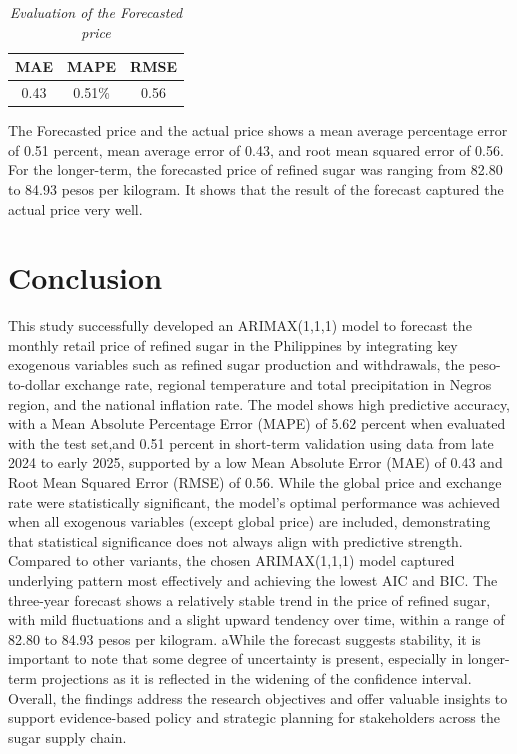 \documentclass[11pt]{article}
\begin{document}
\begin{table}[H]
    \caption{\textit{Evaluation of the Forecasted price}}
    \label{eval}
    \centering
    \begin{tabular}{ccc}
        \toprule
         MAE & MAPE & RMSE \\
        \midrule
        0.43 & 0.51\% & 0.56 \\
        \bottomrule
    \end{tabular}
\end{table}
The Forecasted price and the actual price shows a mean average percentage error of 0.51 percent, mean average error of 0.43, and root mean squared error of 0.56. For the longer-term, the forecasted price of refined sugar was ranging from 82.80 to 84.93 pesos per kilogram. It shows that the result of the forecast captured the actual price very well.

\section{Conclusion}

This study successfully developed an ARIMAX(1,1,1) model to forecast the monthly retail price of refined sugar in the Philippines by integrating key exogenous variables such as refined sugar production and withdrawals, the peso-to-dollar exchange rate, regional temperature and total precipitation in Negros region, and the national inflation rate. The model shows high predictive accuracy, with a Mean Absolute Percentage Error (MAPE) of 5.62 percent when evaluated with the test set,and 0.51 percent in short-term validation using data from late 2024 to early 2025, supported by a low Mean Absolute Error (MAE) of 0.43 and Root Mean Squared Error (RMSE) of 0.56. While the global price and exchange rate were statistically significant, the model's optimal performance was achieved when all exogenous variables (except global price) are included, demonstrating that statistical significance does not always align with predictive strength. Compared to other variants, the chosen ARIMAX(1,1,1) model captured underlying pattern most effectively and achieving the lowest AIC and BIC. The three-year forecast shows a relatively stable trend in the price of refined sugar, with mild fluctuations and a slight upward tendency over time, within a range of 82.80 to 84.93 pesos per kilogram. aWhile the forecast suggests stability, it is important to note that some degree of uncertainty is present, especially in longer-term projections as it is reflected in the widening of the confidence interval. Overall, the findings address the research objectives and offer valuable insights to support evidence-based policy and strategic planning for stakeholders across the sugar supply chain.
\end{document}
